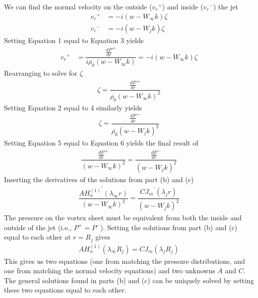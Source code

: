 \documentclass[onecolumn,10pt]{jhwhw}
\begin{document}
We can find the normal velocity on the outside (${v_r}^+$) and inside (${v_r}^-$) the jet
\begin{align}
{v_r}^+ &= -i \left( w - W_{\infty} k \right) \zeta \\
{v_r}^- &= -i \left( w - W_{j} k \right) \zeta
\end{align}
Setting Equation 1 equal to Equation 3 yields
\begin{align*}
{v_r}^+ &= \dfrac{\frac{d P}{d r}^+} {i \overline{\rho_0} \left(w - W_{\infty}k \right) } = -i \left( w - W_{\infty} k \right) \zeta
\end{align*}
Rearranging to solve for $\zeta$
\begin{align}
\zeta = \dfrac{\frac{d P}{d r}^+} {\overline{\rho_0} \left(w - W_{\infty}k \right)^2 }
\end{align}
Setting Equation 2 equal to 4 similarly yields
\begin{align}
\zeta = \dfrac{\frac{d P}{d r}^-} {\overline{\rho_0} \left(w - W_{j}k \right)^2 }
\end{align}
Setting Equation 5 equal to Equation 6 yields the final result of
\begin{align}
\dfrac{\frac{d P}{d r}^+} {\left(w - W_{\infty}k \right)^2 } = \dfrac{\frac{d P}{d r}^-} {\left(w - W_{j}k \right)^2 }
\end{align}
Inserting the derivatives of the solutions from part (b) and (c)
\begin{align}
\dfrac{ A {H_n^{(1)}}^{\prime} (\lambda_{\infty} r) } {\left(w - W_{\infty}k \right)^2 } = \dfrac{C {J_m}^{\prime} (\lambda_j r)} {\left(w - W_{j}k \right)^2 }
\end{align}
The pressure on the vortex sheet must be equivalent from both the inside and outside of the jet (i.e., $P^+ = P^-$). Setting the solutions from part (b) and (c) equal to each other at $r=R_j$ gives
\begin{align*}
A H_n^{(1)} (\lambda_{\infty} R_j) = C J_m (\lambda_j R_j)
\end{align*}
This gives us two equations (one from matching the pressure distributions, and one from matching the normal velocity equations) and two unknowns $A$ and $C$. The general solutions found in parts (b) and (c) can be uniquely solved by setting these two equations equal to each other.
\end{document}
